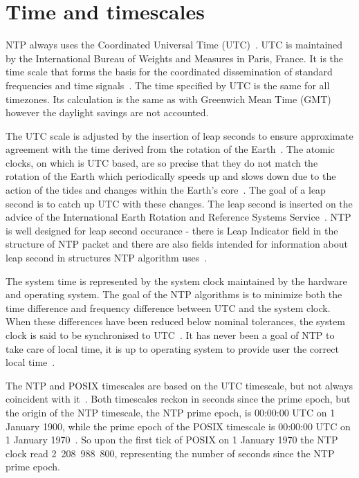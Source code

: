 
\section{Time and timescales}\label{sec:ntp-time}
NTP always uses the Coordinated Universal Time (UTC)~\cite{rfc5905}.
UTC is maintained by the International Bureau of Weights and Measures in Paris, France.
It is the time scale that forms the basis for the coordinated dissemination of standard frequencies and time signals~\cite{bipm-utc}.
The time specified by UTC is the same for all timezones.
Its calculation is the same as with Greenwich Mean Time (GMT) however
the daylight savings are not accounted.

The UTC scale is adjusted by the insertion of leap seconds to ensure approximate
agreement with the time derived from the rotation of the Earth~\cite{bipm-utc}.
The atomic clocks, on which is UTC based, are so precise that
they do not match the rotation of the Earth
which periodically speeds up and slows down due to the action
of the tides and changes within the Earth's core~\cite{cnn-earth}.
The goal of a leap second is to catch up UTC with these changes.
The leap second is inserted on the advice of the International Earth Rotation and Reference Systems Service~\cite{bipm-utc}.
NTP is well designed for leap second occurance -
there is Leap Indicator field
in the structure of NTP packet and there are also fields intended for
information about leap second in structures NTP algorithm uses~\cite{rfc5905}.

The system time is represented by the system clock maintained by
the hardware and operating system.
The goal of the NTP algorithms is to minimize
both the time difference and frequency difference between UTC and the system clock.
When these differences have been reduced below nominal
tolerances, the system clock is said to be synchronised to UTC~\cite{rfc5905}.
It has never been a goal of NTP to take care of local time,
it is up to operating system to provide user the correct local time~\cite{ntp-overview}.

The NTP and POSIX timescales are based on the UTC timescale,
but not always coincident with it~\cite{ntp-leap}.
Both timescales reckon in seconds since the prime epoch,
but the origin of the NTP timescale, the NTP prime epoch, is 00:00:00 UTC on 1 January 1900,
while the prime epoch of the POSIX timescale is 00:00:00 UTC on 1 January 1970~\cite{ntp-leap}.
So upon the first tick of POSIX on 1 January 1970 the NTP clock read 2~208~988~800,
representing the number of seconds since the NTP prime epoch.


